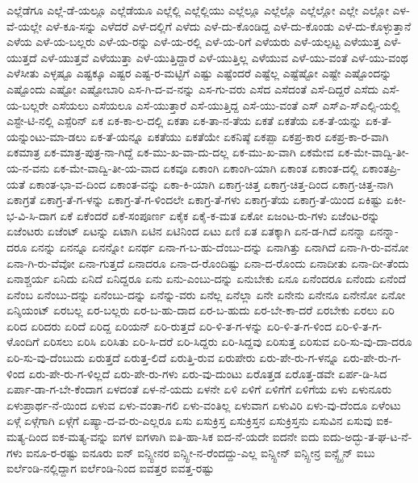 {ಎಲ್ಲೆಡೆಗೂ
ಎಲ್ಲೆ-ಡೆ-ಯಲ್ಲೂ
ಎಲ್ಲೆಡೆಯೂ
ಎಲ್ಲೆಲ್ಲಿ
ಎಲ್ಲೆಲ್ಲಿಯು
ಎಲ್ಲೆಲ್ಲೂ
ಎಲ್ಲೆಲ್ಲೊ
ಎಲ್ಲೆಲ್ಲೋ
ಎಲ್ಲೇ
ಎಲ್ಲೋ
ಎಳ-ವೆ-ಯಲ್ಲೇ
ಎಳೆ-ಕೂ-ಸನ್ನು
ಎಳೆದರೆ
ಎಳೆ-ದಲ್ಲಿಗೆ
ಎಳೆದು
ಎಳೆ-ದು-ಕೊಂಡಿದ್ದ
ಎಳೆ-ದು-ಕೊಂಡು
ಎಳೆ-ದು-ಕೊಳ್ಳುತ್ತಾನೆ
ಎಳೆಯ
ಎಳೆ-ಯ-ಬಲ್ಲರು
ಎಳೆ-ಯ-ರನ್ನು
ಎಳೆ-ಯ-ರಲ್ಲಿ
ಎಳೆ-ಯ-ರಿಗೆ
ಎಳೆಯರು
ಎಳೆ-ಯಲ್ಪಟ್ಟ
ಎಳೆಯುತ್ತ
ಎಳೆ-ಯುತ್ತದೆ
ಎಳೆ-ಯುತ್ತವೆ
ಎಳೆಯುತ್ತಾ
ಎಳೆ-ಯುತ್ತಿದ್ದಾರೆ
ಎಳೆ-ಯುತ್ತಿಲ್ಲ
ಎಳೆಯುವ
ಎಳೆ-ಯು-ವಂತೆ
ಎಳೆ-ಯು-ವಂಥ
ಎಳೆಸೀತು
ಎಳ್ಳಷ್ಟೂ
ಎಷ್ಟಕ್ಕೂ
ಎಷ್ಟರ
ಎಷ್ಟ-ರ-ಮಟ್ಟಿಗೆ
ಎಷ್ಟು
ಎಷ್ಟೆಂದರೆ
ಎಷ್ಟೆಲ್ಲ
ಎಷ್ಟೆಷ್ಟೋ
ಎಷ್ಟೇ
ಎಷ್ಟೊಂದನ್ನು
ಎಷ್ಟೊಂದು
ಎಷ್ಟೋ
ಎಷ್ಟೋಬಾರಿ
ಎಸ-ಗಿ-ದ-ವ-ನನ್ನು
ಎಸ-ಗು-ವರು
ಎಸೆದ
ಎಸೆದಂತೆ
ಎಸೆ-ದಿದ್ದರೆ
ಎಸೆದು
ಎಸೆ-ಯ-ಬಲ್ಲರೇ
ಎಸೆಯಲು
ಎಸೆಯಲೂ
ಎಸೆ-ಯುತ್ತಾರೆ
ಎಸೆ-ಯುತ್ತಿದ್ದ
ಎಸೆ-ಯು-ವಂತೆ
ಎಸ್
ಎಸ್ಎ-ಸ್ಎಲ್ಸಿ-ಯಲ್ಲಿ
ಎಸ್ಟೇ-ಟಿ-ನಲ್ಲಿ
ಎಸ್ಪೆರಿನ್
ಏಕ
ಏಕ-ಕಾ-ಲ-ದಲ್ಲಿ
ಏಕತಾ
ಏಕ-ತಾ-ನ-ತೆಯ
ಏಕತೆ
ಏಕತೆಯ
ಏಕ-ತೆ-ಯನ್ನು
ಏಕ-ತೆ-ಯನ್ನುಂಟು-ಮಾ-ಡಲು
ಏಕ-ತೆ-ಯನ್ನೂ
ಏಕತೆಯು
ಏಕತೆಯೇ
ಏಕನಿಷ್ಠೆ
ಏಕಪ್ಪಾ
ಏಕಪ್ರ-ಕಾರ
ಏಕಪ್ರ-ಕಾ-ರ-ವಾಗಿ
ಏಕಮಾತ್ರ
ಏಕ-ಮಾತ್ರ-ಪುತ್ರ-ನಾ-ಗಿದ್ದೆ
ಏಕ-ಮು-ಖ-ವಾ-ದು-ದಲ್ಲ
ಏಕ-ಮು-ಖ-ವಾಗಿ
ಏಕಮೇವ
ಏಕ-ಮೇ-ವಾದ್ವಿ-ತೀ-ಯ-ನ-ವನು
ಏಕ-ಮೇ-ವಾದ್ವಿ-ತೀ-ಯ-ವಾದ
ಏಕವೂ
ಏಕಾಂಗಿ
ಏಕಾಂಗಿ-ಯಾಗಿ
ಏಕಾಂತ
ಏಕಾಂತ-ದಲ್ಲಿ
ಏಕಾಂತಪ್ರಿ-ಯತೆ
ಏಕಾಂತ-ಭಾ-ವ-ದಿಂದ
ಏಕಾಂತ-ವನ್ನು
ಏಕಾ-ಕಿ-ಯಾಗಿ
ಏಕಾಗ್ರ-ಚಿತ್ತ
ಏಕಾಗ್ರ-ಚಿತ್ತ-ದಿಂದ
ಏಕಾಗ್ರ-ಚಿತ್ತ-ನಾಗಿ
ಏಕಾಗ್ರತೆ
ಏಕಾಗ್ರ-ತೆ-ಗ-ಳನ್ನು
ಏಕಾಗ್ರ-ತೆ-ಗ-ಳಿಂದಲೇ
ಏಕಾಗ್ರ-ತೆ-ಗಳು
ಏಕಾಗ್ರ-ತೆಯ
ಏಕಾಗ್ರ-ತೆ-ಯಿಂದ
ಏಕಿಷ್ಟು
ಏಕೀ-ಭ-ವಿ-ಸಿ-ದಾಗ
ಏಕೆ
ಏಕೆಂದರೆ
ಏಕೆ-ಸಂಪೂರ್ಣ
ಏಕೈಕ
ಏಕೈ-ಕ-ಮತ
ಏಕೋ
ಏಜಂಟ-ರು-ಗಳು
ಏಜೆಂಟ-ರನ್ನು
ಏಜೆಂಟರು
ಏಜೆಂಟ್
ಏಟನ್ನು
ಏಟಾಗಿ
ಏಟಿನ
ಏಟಿನಿಂದ
ಏಟು
ಏಣಿ
ಏತ
ಏತಕ್ಕಾಗಿ
ಏನ-ಡ-ಗಿದೆ
ಏನನ್ನಾ
ಏನನ್ನಾ-ದರೂ
ಏನನ್ನು
ಏನನ್ನೂ
ಏನನ್ನೋ
ಏನರ್ಥ
ಏನಾ-ಗ-ಬ-ಹು-ದೆಂಬು-ದನ್ನು
ಏನಾಗಿತ್ತು
ಏನಾಗಿದೆ
ಏನಾ-ಗಿ-ರು-ವನೋ
ಏನಾ-ಗಿ-ರು-ವೆವೋ
ಏನಾ-ಗುತ್ತದೆ
ಏನಾದರೂ
ಏನಾ-ದ-ರೊಂದಿಷ್ಟು
ಏನಾ-ದ-ರೊಂದು
ಏನಾದೀತು
ಏನಾ-ದೀ-ತೆಂದು
ಏನಾಶ್ಚರ್ಯ
ಏನಿದು
ಏನಿದೆ
ಏನಿದ್ದರೂ
ಏನು
ಏನು-ಎಂಬು-ದನ್ನು
ಏನುಬೇಕು
ಏನೂ
ಏನೆಂದರೂ
ಏನೆಂದು
ಏನೆಂದೆ
ಏನೆಂಬ
ಏನೆಂಬು-ದನ್ನು
ಏನೆಂಬು-ದನ್ನು
ಏನೆನ್ನು-ವರು
ಏನೆಲ್ಲ
ಏನೆಲ್ಲಾ
ಏನೇ
ಏನೇನು
ಏನೇನೂ
ಏನೇನೋ
ಏನೋ
ಏನ್ಶಿಯಂಟ್
ಏರಬಲ್ಲ
ಏರ-ಬಲ್ಲರು
ಏರ-ಬ-ಹು-ದಾದ
ಏರ-ಬ-ಹುದು
ಏರ-ಬೇ-ಕಾ-ದರೆ
ಏರಬೇಕು
ಏರಲು
ಏರಿ
ಏರಿದ
ಏರಿದರು
ಏರಿದೆ
ಏರಿದ್ದ
ಏರಿಯನ್
ಏರಿ-ರುತ್ತದೆ
ಏರಿ-ಳಿ-ತ-ಗ-ಳನ್ನು
ಏರಿ-ಳಿ-ತ-ಗ-ಳಿಂದ
ಏರಿ-ಳಿ-ತ-ಗ-ಳೊಂದಿಗೆ
ಏರಿಸಲು
ಏರಿಸಿ
ಏರಿಸಿತು
ಏರಿ-ಸಿ-ದರೆ
ಏರಿ-ಸಿದ್ದರು
ಏರಿ-ಸಿದ್ದವು
ಏರಿಸುತ್ತ
ಏರಿಸುವ
ಏರಿ-ಸು-ವು-ದಾ-ದರೂ
ಏರಿ-ಸು-ವು-ದೆಂಬುದು
ಏರುತ್ತದೆ
ಏರುತ್ತ-ಲಿದೆ
ಏರುತ್ತಿ-ರುವ
ಏರುಪೇರು
ಏರು-ಪೇ-ರು-ಗ-ಳನ್ನೂ
ಏರು-ಪೇ-ರು-ಗ-ಳಿಂದ
ಏರು-ಪೇ-ರು-ಗ-ಳಿಲ್ಲದೆ
ಏರು-ಪೇ-ರು-ಗಳು
ಏರು-ವು-ದುಂಟು
ಏರೊತ್ತಡ
ಏರೊತ್ತ-ಡವೇ
ಏರ್ಪ-ಡಿ-ಸಿದ
ಏರ್ಪಾ-ಡಾ-ಗ-ಬೇ-ಕೆಂದಾಗ
ಏಳದಂತೆ
ಏಳ-ನೆ-ಯದು
ಏಳನೇ
ಏಳಿ
ಏಳಿಗೆ
ಏಳಿಗೆಗೆ
ಏಳಿಗೆಯ
ಏಳು
ಏಳುನೂರು
ಏಳುಪ್ರಾರ್ಥ-ನೆ-ಯಿಂದ
ಏಳುವ
ಏಳು-ವಂತಾ-ಗಲಿ
ಏಳು-ವಂತಿಲ್ಲ
ಏಳುವಾಗ
ಏಳುವಿರಿ
ಏಳು-ವು-ದೆಂದೂ
ಏಳೆಂಟು
ಏಳ್ಗೆ
ಏಳ್ಗೆಗಾಗಿ
ಏಳ್ಗೆಗೆ
ಏಷ್ಯಾ-ದ-ವ-ರು-ಎಲ್ಲರೂ
ಏಸು
ಏಸುಕ್ರಿಸ್ತ
ಏಸುಕ್ರಿಸ್ತನ
ಏಸುಕ್ರಿಸ್ತನು
ಏಸುವಿನ
ಏಸುವು
ಐಕ-ಮತ್ಯ-ದಿಂದ
ಐಕ-ಮತ್ಯ-ವನ್ನು
ಐಗಳ
ಐಗಳಾಗಿ
ಐತಿ-ಹಾ-ಸಿಕ
ಐದ-ನೆ-ಯದೇ
ಐದನೇ
ಐದು
ಐದು-ಅದ್ಭು-ತ-ಘ-ಟ-ನೆ-ಗಳು
ಐನೂ-ರ-ರಷ್ಟು
ಐನೂರು
ಐನ್
ಐನ್ಸ್ಟೀನರ
ಐನ್ಸ್ಟೀ-ನ-ರೆಂದದ್ದು-ಎಲ್ಲ
ಐನ್ಸ್ಟೀನ್
ಐನ್ಸ್ಟೀನ್ರ
ಐನ್ಸ್ಟೈನ್
ಐಬು
ಐರ್ಲೆಂಡಿ-ನಲ್ಲಿದ್ದಾಗ
ಐರ್ಲೆಂಡಿ-ನಿಂದ
ಐವತ್ತರ
ಐವತ್ತ-ರಷ್ಟು
}
